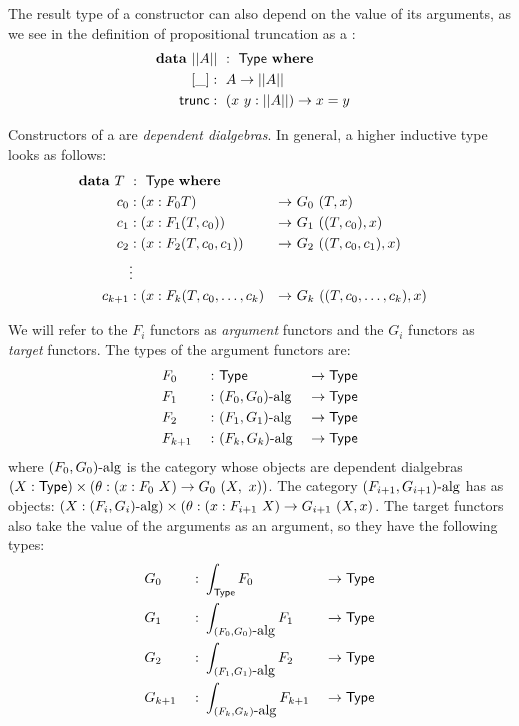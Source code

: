 \documentclass[a4paper,10pt]{article}
\begin{document}
The result type of a constructor can also depend on the value of its
arguments, as we see in the definition of propositional truncation as
a \hit:
%
\begin{alignat*}{2}
  &\rlap{$\data\ || A ||\ :\ \Type\ \where$} \\
  &&\ \ [\_]   &:\ A \to || A || \\
  &&\ \ \trunc &:\ (x\ y : || A ||) \to x = y
\end{alignat*}

Constructors of a \hit are \emph{dependent dialgebras}. In general, a
higher inductive type looks as follows:
%
\begin{alignat*}{5}
  &\rlap{$\data\ T\ :\ \Type\ \where$}& \\
  &&\ \ c_0    &: (x : F_0 T)                    &\to\ &G_0\ (T, x)& \\
  &&\ \ c_1    &: (x : F_1 (T,c_0))              &\to\ &G_1\ ((T, c_0), x)& \\
  &&\ \ c_2    &: (x : F_2 (T,c_0,c_1))          &\to\ &G_2\ ((T, c_0, c_1), x)& \\
  &&\ \        &\vdots &&&\\
  &&\ \ c_{k+1} & : (x : F_k (T,c_0, \hdots, c_k) &\to\ &G_k\ ((T, c_0, \hdots, c_k), x)&
\end{alignat*}

We will refer to the $F_i$ functors as \emph{argument} functors and the
$G_i$ functors as \emph{target} functors. The types of the argument
functors are:
%
\begin{alignat*}{6}
&F_0     &\ :\ &\mathsf{Type}                &\ \to \mathsf{Type}& \\
&F_1     &\ :\ &(F_0, G_0)\mbox{-alg}  &\ \to \mathsf{Type}& \\      
&F_2     &\ :\ &(F_1, G_1)\mbox{-alg}  &\ \to \mathsf{Type}& \\      
&F_{k+1} &\ :\ &(F_k, G_k)\mbox{-alg}  &\ \to \mathsf{Type}&
\end{alignat*}
%
where $(F_0, G_0)\mbox{-alg}$ is the category whose objects are dependent
dialgebras $(X : \mathsf{Type}) \times (\theta : (x : F_0\ X) \to G_0\ (X,\ x))$. The category
$(F_{i+1},G_{i+1})\mbox{-alg}$ has as objects: $(X : (F_i,G_i)\mbox{-alg}) \times (\theta : (x :
F_{i+1}\ X) \to G_{i+1}\ (X, x)$. The target functors also take the value of
the arguments as an argument, so they have the following types:
%
\begin{alignat*}{6}
&G_0     &\ :\ &\int_{\Type} F_0                &\ \to \Type& \\
&G_1     &\ :\ &\int_{\algcat{(F_0, G_0)}} F_1  &\ \to \Type& \\      
&G_2     &\ :\ &\int_{\algcat{(F_1, G_1)}} F_2  &\ \to \Type& \\      
&G_{k+1} &\ :\ &\int_{\algcat{(F_k, G_k)}} F_{k+1}  &\ \to \Type&
\end{alignat*}
\end{document}
